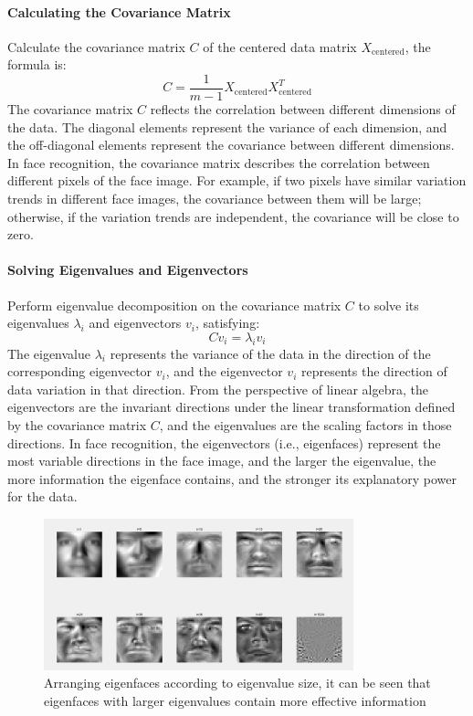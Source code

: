 \documentclass{article}
\begin{document}
\paragraph{Calculating the Covariance Matrix}
Calculate the covariance matrix \( C \) of the centered data matrix \( X_{\text{centered}} \), the formula is:
\[
C = \frac{1}{m - 1} X_{\text{centered}} X_{\text{centered}}^T
\]
The covariance matrix \( C \) reflects the correlation between different dimensions of the data. The diagonal elements represent the variance of each dimension, and the off-diagonal elements represent the covariance between different dimensions. In face recognition, the covariance matrix describes the correlation between different pixels of the face image. For example, if two pixels have similar variation trends in different face images, the covariance between them will be large; otherwise, if the variation trends are independent, the covariance will be close to zero.

\paragraph{Solving Eigenvalues and Eigenvectors}
Perform eigenvalue decomposition on the covariance matrix \( C \) to solve its eigenvalues \( \lambda_i \) and eigenvectors \( v_i \), satisfying:
\[
C v_i = \lambda_i v_i
\]
The eigenvalue \( \lambda_i \) represents the variance of the data in the direction of the corresponding eigenvector \( v_i \), and the eigenvector \( v_i \) represents the direction of data variation in that direction. From the perspective of linear algebra, the eigenvectors are the invariant directions under the linear transformation defined by the covariance matrix \( C \), and the eigenvalues are the scaling factors in those directions. In face recognition, the eigenvectors (i.e., eigenfaces) represent the most variable directions in the face image, and the larger the eigenvalue, the more information the eigenface contains, and the stronger its explanatory power for the data.

\begin{figure}[H]
    \centering
    \includegraphics[width=0.8\textwidth]{Img/v2-62f392d4e1056457c15ccb4dd81dc539_1440w.png}
    \caption{Arranging eigenfaces according to eigenvalue size, it can be seen that eigenfaces with larger eigenvalues contain more effective information}
\end{figure}
\end{document}
